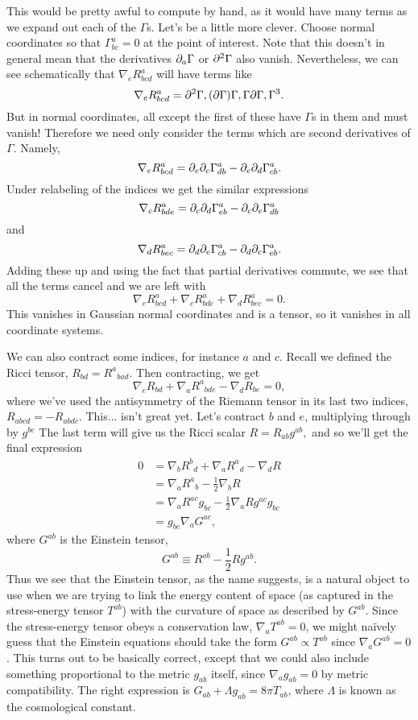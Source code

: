 This would be pretty awful to compute by hand, as it would have many terms as we expand out each of the $\Gamma$s. Let's be a little more clever. Choose normal coordinates so that $\Gamma^a_{bc}=0$ at the point of interest. Note that this doesn't in general mean that the derivatives $\partial_a \Gamma$ or $\partial^2 \Gamma$ also vanish. Nevertheless, we can see schematically that $\nabla_e R^a_{bcd}$ will have terms like
$$\nabla_e R^a_{bcd}=\partial^2\Gamma,(\partial \Gamma)\Gamma, \Gamma \partial \Gamma, \Gamma^3.$$
But in normal coordinates, all except the first of these have $\Gamma$s in them and must vanish! Therefore we need only consider the terms which are second derivatives of $\Gamma.$ Namely,
$$\nabla_e R^a_{bcd}=\partial_e \partial_c \Gamma^a_{db}-\partial_e \partial_d \Gamma^a_{cb}.$$
Under relabeling of the indices we get the similar expressions
$$\nabla_c R^a_{bde}=\partial_c \partial_d \Gamma^a_{eb}-\partial_c \partial_e \Gamma^a_{db}$$
and
$$\nabla_d R^a_{bec}=\partial_d \partial_e \Gamma^a_{cb}-\partial_d \partial_c \Gamma^a_{eb}.$$
Adding these up and using the fact that partial derivatives commute, we see that all the terms cancel and we are left with
$$\nabla_e R^a_{bcd}+\nabla_c R^a_{bde}+\nabla_d R^a_{bec}=0.$$
This vanishes in Gaussian normal coordinates and is a tensor, so it vanishes in all coordinate systems.

We can also contract some indices, for instance $a$ and $c$. Recall we defined the Ricci tensor, $R_{bd}=R^a{}_{bad}$. Then contracting, we get
$$\nabla_e R_{bd}+\nabla_a R^a{}_{bde}-\nabla_d R_{be}=0,$$
where we've used the antisymmetry of the Riemann tensor in its last two indices, $R_{abcd}=-R_{abdc}.$ This... isn't great yet. Let's contract $b$ and $e$, multiplying through by $g^{be}$ The last term will give us the Ricci scalar $R=R_{ab}g^{ab},$ and so we'll get the final expression
\begin{align*}
0&=\nabla_b R^b{}_d +\nabla_a R^a{}_d -\nabla_d R\\
&=\nabla_a R^a{}_b -\frac{1}{2}\nabla_b R\\
&=\nabla_a R^{ac} g_{bc} -\frac{1}{2}\nabla_a R g^{ac} g_{bc}\\
&= g_{bc} \nabla_a G^{ac},
\end{align*}
where $G^{ab}$ is the Einstein tensor,
$$G^{ab}\equiv R^{ab}-\frac{1}{2}Rg^{ab}.$$
Thus we see that the Einstein tensor, as the name suggests, is a natural object to use when we are trying to link the energy content of space (as captured in the stress-energy tensor $T^{ab}$) with the curvature of space as described by $G^{ab}$. Since the stress-energy tensor obeys a conservation law, $\nabla_a T^{ab}=0$, we might na\"ively guess that the Einstein equations should take the form $G^{ab}\propto T^{ab}$ since $\nabla_a G^{ab}=0$. This turns out to be basically correct, except that we could also include something proportional to the metric $g_{ab}$ itself, since $\nabla_a g_{ab}=0$ by metric compatibility. The right expression is $G_{ab}+\Lambda g_{ab}= 8\pi T_{ab}$, where $\Lambda$ is known as the cosmological constant.

